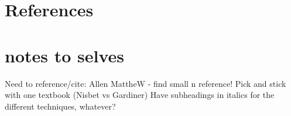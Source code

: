 \documentclass[a4paper,10pt]{article}
\numberwithin{equation}{section} %
\begin{document}


\section{References}





\section{notes to selves}
Need to reference/cite: Allen
MattheW - find small n reference!
Pick and stick with one textbook (Nisbet vs Gardiner)
Have subheadings in italics for the different techniques, whatever?

















































\newpage
\end{document}
